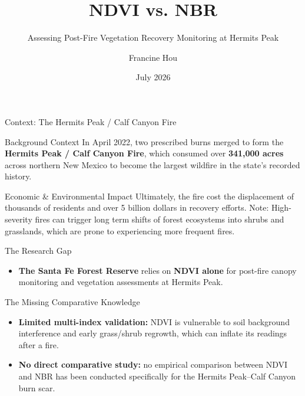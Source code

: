 \documentclass[10pt, aspectratio=169]{beamer}
\title[NDVI vs. NBR]{NDVI vs. NBR}
\subtitle{Assessing Post-Fire Vegetation Recovery Monitoring at Hermits Peak}
\author[F. Hou]{Francine Hou}
\institute[ICR]{Institute for Computing in Research}
\date{July 2026}
\begin{document}
\frame{\titlepage}

\begin{frame}{Context: The Hermits Peak / Calf Canyon Fire}
    \begin{block}{Background Context}
        In April 2022, two prescribed burns merged to form the \textbf{Hermits Peak / Calf Canyon Fire}, which consumed over \textbf{341,000 acres} across northern New Mexico to become the largest wildfire in the state's recorded history.
    \end{block}

    \vspace{0.5em}

    \begin{block}{Economic \& Environmental Impact}
        Ultimately, the fire cost the displacement of thousands of residents and over 5 billion dollars in recovery efforts.
        Note: High-severity fires can trigger long term shifts of forest ecosystems into shrubs and grasslands, which are prone to experiencing more frequent fires.
    \end{block}

    
\end{frame}

\begin{frame}{The Research Gap}

\begin{itemize}
    \item \textbf{The Santa Fe Forest Reserve} relies on \textbf{NDVI alone} for post-fire canopy monitoring and vegetation assessments at Hermits Peak.
\end{itemize}

\vspace{0.5em}

\begin{alertblock}{The Missing Comparative Knowledge}
\begin{itemize}
    \item \textbf{Limited multi-index validation:} NDVI is vulnerable to soil background interference and early  grass/shrub regrowth, which can inflate its readings after a fire.
    \item \textbf{No direct comparative study:} no empirical comparison between NDVI and NBR has been conducted specifically for the Hermits Peak--Calf Canyon burn scar.
\end{itemize}
\end{alertblock}
\end{frame}
\end{document}
